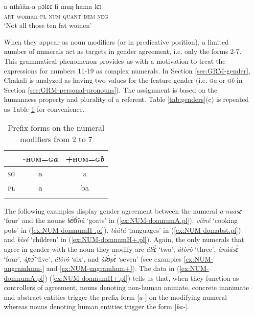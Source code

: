 \begin{exe}
\begin{exe}
\begin{exe}
{\begin{exe}
\begin{exe}
\begin{exe}
\begin{exe}
\begin{exe}
\begin{exe}
\begin{exe}
\begin{xlist}
\begin{exe}
\begin{exe}
\begin{exe}
 \ex\label{ex:full-temp}
\gll a nɪhããn-a pɔlɛɛ fi muŋ hama  lɛɪ\\
\textsc{art} {woman-\textsc{pl}} {\qual}  \textsc{num} \textsc{quant}
\textsc{dem}
\textsc{neg}\\
\glt `Not all those ten fat  women'

\z
\z

When they appear as noun modifiers  (or in predicative position),  a limited
number of numerals act as targets in gender agreement, i.e. only the forms 2-7. 
 This grammatical
phenomenon provides us with a  motivation to treat  the expressions for numbers
11-19 as complex numerals.
In Section \ref{sec:GRM-gender},  Chakali is analyzed as having two values for
the
feature gender (i.e. \textsc{g}{\it a} or \textsc{g}{\it b} in Section 
\ref{sec:GRM-personal-pronouns}). The assignment is based on the humanness 
property and
plurality of a referent.  Table \ref{tab:genders}(c) is repeated as Table 
\ref{tab:distagree} for convenience. 


\begin{table}[h]
\caption{Prefix forms on the numeral modifiers  from 2 
to 7\label{tab:distagree}}
\centering
 \begin{tabular}{lcc}
\lsptoprule
&\textsc{-hum}=\textsc{g}\textit{a}&\textsc{+hum}=\textsc{g}\textit{b}\\
\midrule
\textsc{sg}&a&a\\
\textsc{pl}&a&ba\\
\lspbottomrule
 \end{tabular} 


\end{table} 

The following examples display gender agreement between the numeral {\it 
a-naasɛ}
`four' and the nouns {\it bʊ̃́ʊ̃̀nà}  `goats' in (\ref{ex:NUM-domnumA.pl}), 
{\it
vííné} `cooking pots' in (\ref{ex:NUM-domnumH-.pl}), {\it tàátá} 
`languages' in (\ref{ex:NUM-domabst.pl}) and {\it bìsé} `children'  in
(\ref{ex:NUM-domnumH+.pl}). Again, the only numerals that agree in gender with
the noun they modify are {\it álìɛ̀} `two', {\it átòrò}  `three', {\it
ànáásɛ̀} `four', {\it àɲɔ̃́} `five', {\it álòrò}  `six',  and   {\it 
àlʊ̀pɛ̀}
 `seven' (see examples \ref{ex:NUM-ungramhum-} and \ref{ex:NUM-ungramhum+}).
 The data in (\ref{ex:NUM-domnumA.pl})-(\ref{ex:NUM-domnumH+.pl}) tells us
that, when they function as controllers of agreement, nouns denoting non-human
animate, concrete inanimate and abstract entities  trigger the prefix form 
[{\it a-}] on the modifying numeral whereas nouns denoting human entities 
trigger the
form [{\it ba-}]. 



\end{exe}
\end{exe}
\end{exe}
\end{xlist}
\end{exe}
\end{exe}
\end{exe}
\end{exe}
\end{exe}
\end{exe}
\end{exe}}
\end{exe}
\end{exe}
\end{exe}
